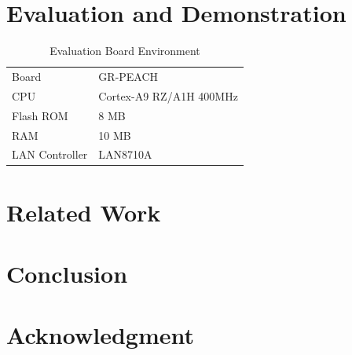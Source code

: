 \documentclass[conference]{IEEEtran/IEEEtran}
\begin{document}
\section{Evaluation and Demonstration}
\label{sec:Evaluation and Demonstration}

\begin{table}[t]
    \centering
    \caption{Evaluation Board Environment}
    \begin{tabular}{l|l}
        \hline\hline
        Board           &   GR-PEACH                \\
        CPU             &   Cortex-A9 RZ/A1H 400MHz \\
        Flash ROM       &   8 MB                    \\
        RAM             &   10 MB                   \\
        LAN Controller  &   LAN8710A                \\
        \hline
    \end{tabular}
    \label{tab:Evaluation_Board_Environment}
\end{table}


\section{Related Work}
\label{sec:Related Work}

\section{Conclusion}
\label{sec:Conclusion}



\section*{Acknowledgment}





\end{document}
